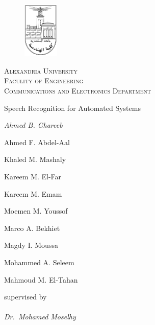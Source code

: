 \documentclass[12pt, a4paper, twoside]{report}
\begin{document}
\begin{titlepage}
\begin{figure}[]
	\flushleft
	\includegraphics[width=0.15\textwidth]
	{images/chapter1/logo}
\end{figure}
		{\scshape Alexandria University\\}
		{\scshape Faculity of Engineering\\}
		{\scshape Communications and Electronics Department\\}
	\vfill
	{\huge \centering Speech Recognition for Automated Systems\par}
	\vfill
	{\Large\itshape
		Ahmed B. Ghareeb\par
		Ahmed F. Abdel-Aal\par
		Khaled M. Mashaly\par
		Kareem M. El-Far\par
		Kareem M. Emam\par
		Moemen M. Youssof\par
		Marco A. Bekhiet\par
		Magdy I. Moussa\par
		Mohammed A. Seleem\par
		Mahmoud M. El-Tahan\par
	}
	\vspace{1cm}
	supervised by\\ \\
	{\Large\itshape Dr.~Mohamed Moselhy}
\end{titlepage}

\begin{abstract}
Speech is the way of communication between the human. It also defined as it is a process which automatically recognizes the spoken words of person based on given speech signal information. It is also known as Automatic Speech Recognition or computer speech recognition and speech to text conversion. Automatic speech recognition is the very interesting area of research and lots of research work has been done by number of researchers. To recognize the speech feature extraction and word recognition these two steps are followed. After feature extraction feature matching is performed for word recognition. This project describe the different feature extractions techniques like MFCC and DWT (combined with LPC) and pattern recognition which is done by using 4 different techniques like neural network (NN), hidden markov model (HMM), gaussian mixture model (GMM) and dynamic time warping (DTW).
\end{abstract}
\end{document}
